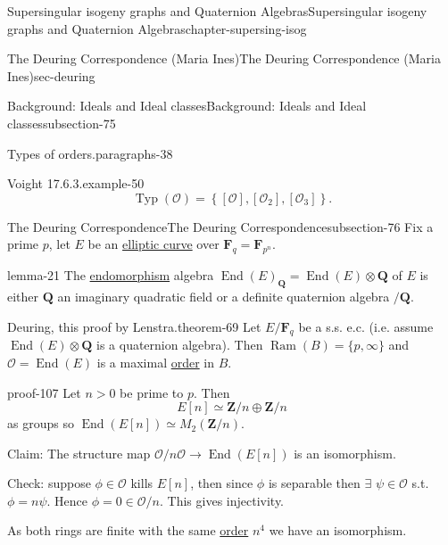 \documentclass[oneside,10pt,]{book}
\numberwithin{equation}{section}
\newcommand{\lb}{[}
\newcommand{\rb}{]}
\newcommand{\ZZ}{\mathbf{Z}}
\newcommand{\QQ}{\mathbf{Q}}
\newcommand{\FF}{\mathbf{F}}
\newcommand{\ints}{\mathcal{O}}
\DeclareMathOperator{\End}{End}
\newcommand{\gt}{>}
\begin{document}
\begin{chapterptx}{Supersingular isogeny graphs and Quaternion Algebras}{}{Supersingular isogeny graphs and Quaternion Algebras}{}{}{chapter-supersing-isog}
\begin{sectionptx}{The Deuring Correspondence (Maria Ines)}{}{The Deuring Correspondence (Maria Ines)}{}{}{sec-deuring}
\begin{subsectionptx}{Background: Ideals and Ideal classes}{}{Background: Ideals and Ideal classes}{}{}{subsection-75}
\begin{paragraphs}{Types of orders.}{paragraphs-38}
\begin{example}{Voight 17.6.3.}{example-50}
\begin{equation*}
\operatorname{Typ}(\ints) =  \left\{ \lb \ints \rb , \lb \ints_2 \rb , \lb \ints_3 \rb \right\}\text{.}
\end{equation*}
%
\end{example}
\end{paragraphs}%
\end{subsectionptx}
%
%
\typeout{************************************************}
\typeout{************************************************}
%
\begin{subsectionptx}{The Deuring Correspondence}{}{The Deuring Correspondence}{}{}{subsection-76}
\hypertarget{p-956}{}%
Fix a prime \(p\), let \(E\) be an \hyperref[def-supersing-isog-ec]{elliptic curve} over \(\FF_q = \FF_{p^n}\).%
\begin{lemma}{}{}{lemma-21}%
\hypertarget{p-957}{}%
The \hyperref[def-supersing-isog-endo]{endomorphism} algebra  \(\End(E)_\QQ = \End(E) \otimes \QQ\) of \(E\) is either \(\QQ\) an imaginary quadratic field or a definite quaternion algebra \(/\QQ\).%
\end{lemma}
\begin{theorem}{Deuring, this proof by Lenstra.}{}{theorem-69}%
\hypertarget{p-958}{}%
Let \(E/\FF_q\) be a s.s. e.c. (i.e. assume \(\End(E) \otimes \QQ\) is a quaternion algebra). Then \(\operatorname{Ram}(B)  =    \{p, \infty\}\) and \(\ints = \End(E) \) is a maximal \hyperref[def-order-quaternion]{order} in \(B\).%
\end{theorem}
\begin{proofptx}{}{proof-107}
\hypertarget{p-959}{}%
Let \(n \gt 0\)  be prime to \(p \). Then%
\begin{equation*}
E \lb n \rb  \simeq \ZZ/ n \oplus \ZZ/n
\end{equation*}
as groups so \(\End(E\lb n\rb ) \simeq M_2(\ZZ/n)\).%
\par
\hypertarget{p-960}{}%
Claim: The structure map \(\ints/n\ints  \to \End(E\lb n \rb)\) is an isomorphism.%
\par
\hypertarget{p-961}{}%
Check: suppose \(\phi \in  \ints\) kills \(E\lb n \rb\), then since \(\phi\) is separable then \(\exists\) \(\psi \in \ints\) s.t. \(\phi = n \psi\). Hence \(\phi = 0 \in \ints/n\). This gives injectivity.%
\par
\hypertarget{p-962}{}%
As both rings are finite with the same \hyperref[def-order-quaternion]{order} \(n^4\) we have an isomorphism.%
\par
\hypertarget{p-963}{}%

\end{proofptx}
\end{subsectionptx}
\end{sectionptx}
\end{chapterptx}
\end{document}
